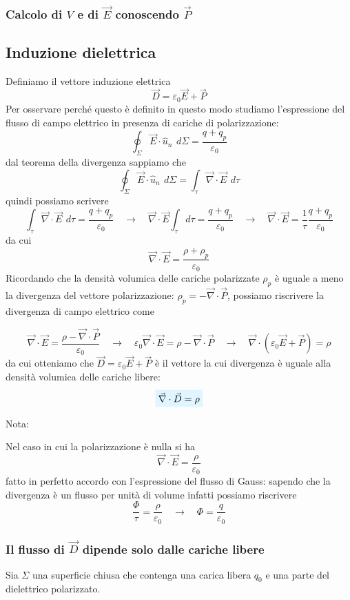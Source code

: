 \documentclass[x11names]{report}
\newcommand{\nota}[2]{
	\begin{attenzione}{Nota:}
		#2
	\end{attenzione}
}
\newcommand{\viola}[1]{%
	\colorbox{myblue}{$\displaystyle #1$}
}
\begin{document}
\subsubsection{Calcolo di \(V\) e di \(\vec{E}\) conoscendo \(\vec{P}\)}

\subsection{Induzione dielettrica}
Definiamo il vettore induzione elettrica
\[
\vec{D} = \varepsilon_0\vec{E} + \vec{P	}
\]
Per osservare perché questo è definito in questo modo studiamo l'espressione del flusso di campo elettrico in presenza di cariche di polarizzazione:
\[
\oint_{\Sigma} \vec{E} \cdot \hat{u}_n \,\ d\Sigma = \frac{q + q_p}{\varepsilon_0}
\]
dal teorema della divergenza sappiamo che 
\[
\oint_{\Sigma}\vec{E} \cdot \hat{u}_n \,\ d\Sigma = \int_{\tau} \vec{\nabla}\cdot \vec{E} \,\ d\tau
\]
quindi possiamo scrivere
\[
\int_{\tau} \vec{\nabla}\cdot \vec{E} \,\ d\tau = \frac{q + q_p}{\varepsilon_0} \quad \to \quad \vec{\nabla}\cdot \vec{E} \int_{\tau}  d\tau = \frac{q + q_p}{\varepsilon_0} \quad \to \quad \vec{\nabla}\cdot \vec{E} = \frac{1}{\tau}  \frac{q + q_p}{\varepsilon_0}
\]
da cui
\[
\vec{\nabla}\cdot \vec{E} = \frac{\rho + \rho_p}{\varepsilon_0}
\]
Ricordando che la densità volumica delle cariche polarizzate \(\rho_p\) è uguale a meno la divergenza del vettore polarizzazione: \(\rho_p = - \vec{\nabla}\cdot \vec{P}\), possiamo riscrivere la divergenza di campo elettrico come

\[
\vec{\nabla}\cdot \vec{E} = \frac{\rho - \vec{\nabla}\cdot \vec{P}}{\varepsilon_0}  \quad \to \quad \varepsilon_0\vec{\nabla}\cdot \vec{E} = \rho - \vec{\nabla}\cdot \vec{P} \quad \to \quad \vec{\nabla} \cdot \left(\varepsilon_0\vec{E} + \vec{P}\right) = \rho
\]
da cui otteniamo che \(\vec{D} = \varepsilon_0\vec{E} + \vec{P}\) è il vettore la cui divergenza è uguale alla densità volumica delle cariche libere:
\begin{equation}
	\viola{\vec{\nabla} \cdot \vec{D}= \rho} 
\end{equation}
\nota{}{
\label{approx senza p}
Nel caso in cui la polarizzazione è nulla si ha
\[
\vec{\nabla} \cdot \vec{E} = \frac{\rho}{\varepsilon_0}
\]
fatto in perfetto accordo con l'espressione del flusso di Gauss: sapendo che la divergenza è un flusso per unità di volume infatti possiamo riscrivere 
\[
\frac{\Phi}{\tau} = \frac{\rho}{\varepsilon_0} \quad \to \quad \Phi = \frac{q}{\varepsilon_0}
\]
}

\subsubsection{Il flusso di \(\vec{D}\) dipende solo dalle cariche libere}
Sia \(\Sigma\) una superficie chiusa che contenga una carica libera \(q_0\) e una parte del dielettrico polarizzato. 
\end{document}
